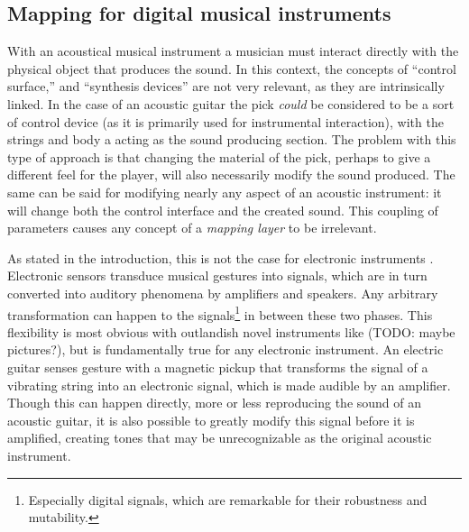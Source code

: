 
\subsection{Mapping for digital musical instruments} \label{sec:mappingforDMIs}

With an acoustical musical instrument a musician must interact directly with the physical object that produces the sound. In this context, the concepts of ``control surface,'' and ``synthesis devices'' are not very relevant, as they are intrinsically linked. In the case of an acoustic guitar the pick \emph{could} be considered to be a sort of control device (as it is primarily used for instrumental interaction), with the strings and body a acting as the sound producing section. The problem with this type of approach is that changing the material of the pick, perhaps to give a different feel for the player, will also necessarily modify the sound produced. The same can be said for modifying nearly any aspect of an acoustic instrument: it will change both the control interface and the created sound. This coupling of parameters causes any concept of a \emph{mapping layer} to be irrelevant.

As stated in the introduction, this is not the case for electronic instruments . Electronic sensors transduce musical gestures into signals, which are in turn converted into auditory phenomena by amplifiers and speakers. Any arbitrary transformation can happen to the signals\footnote{Especially digital signals, which are remarkable for their robustness and mutability.} in between these two phases. This flexibility is most obvious with outlandish novel instruments like (TODO: maybe pictures?), but is fundamentally true for any electronic instrument. An electric guitar senses gesture with a magnetic pickup that transforms the signal of a vibrating string into an electronic signal, which is made audible by an amplifier. Though this can happen directly, more or less reproducing the sound of an acoustic guitar, it is also possible to greatly modify this signal before it is amplified, creating tones that may be unrecognizable as the original acoustic instrument.

